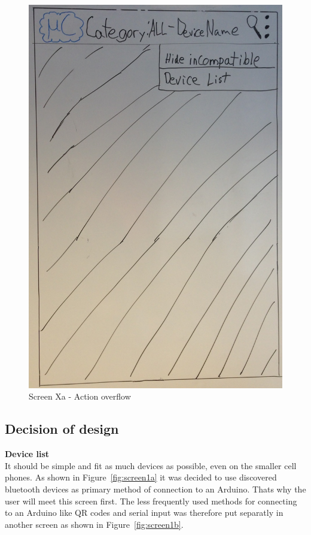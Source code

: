 \begin{figure}[H]
\centering
\includegraphics[scale=0.2]{images/Design_guide/ScreenXa.png}
\caption{Screen Xa - Action overflow}
\label{fig:screenXa}
\end{figure}

	\subsection{Decision of design}
	\textbf{Device list}\\
	It should be simple and fit as much devices as possible, even on the smaller cell phones. As shown in Figure~\ref{fig:screen1a} it was decided to use discovered bluetooth devices as primary method of connection to an Arduino. Thats why the user will meet this screen first. The less frequently used methods for connecting to an Arduino like QR codes and serial input was therefore put separatly in another screen as shown in Figure~\ref{fig:screen1b}. \\

